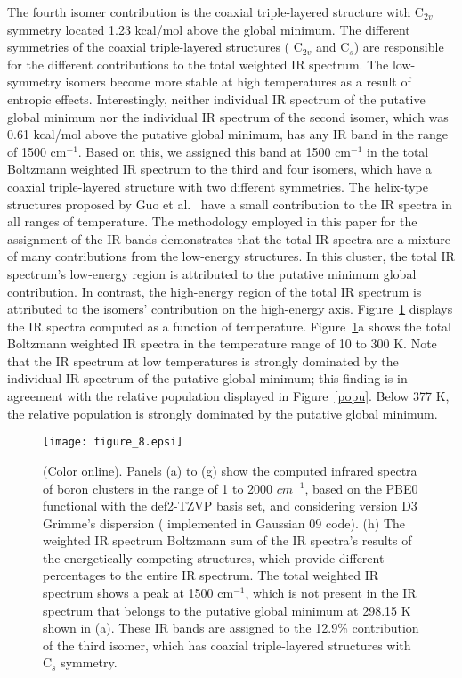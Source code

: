 \documentclass[prb,aps,preprint,showkeys,showpacs]{revtex4}
\begin{document}
The fourth isomer contribution is the coaxial triple-layered structure with C$_{2v}$ symmetry located 1.23 kcal/mol above the global minimum. The different symmetries of the coaxial triple-layered structures ( C$_{2v}$ and C$_s$) are responsible for the different contributions to the total weighted IR spectrum. The low-symmetry isomers become more stable at high temperatures as a result of entropic effects. Interestingly, neither individual IR spectrum of the putative global minimum nor the individual IR spectrum of the second isomer, which was 0.61 kcal/mol above the putative global minimum, has any IR band in the range of 1500 cm$^{-1}$. Based on this, we assigned this band at 1500 cm$^{-1}$ in the total Boltzmann weighted IR spectrum to the third and four isomers, which have a coaxial triple-layered structure with two different symmetries. The helix-type structures proposed by Guo et al.~\cite{Guo} have a small contribution to the IR spectra in all ranges of temperature. The methodology employed in this paper for the assignment of the IR bands demonstrates that the total IR spectra are a mixture of many contributions from the low-energy structures. In this cluster, the total IR spectrum’s low-energy region is attributed to the putative minimum global contribution. In contrast, the high-energy region of the total IR spectrum is attributed to the isomers’ contribution on the high-energy axis. 
Figure~\ref{irs8} displays the IR spectra computed as a function of temperature. Figure~\ref{irs8}a shows the total Boltzmann weighted IR spectra in the temperature range of 10 to 300 K. Note that the IR spectrum at low temperatures is strongly dominated by the individual IR spectrum of the putative global minimum; this finding is in agreement with the relative population displayed in Figure~\ref{popu}. Below 377 K, the relative population is strongly dominated by the putative global minimum.
\begin{figure}[ht!]
  \begin{center}
  \texttt{[image: figure\_8.epsi]} 
  \caption{(Color online). Panels (a) to (g) show the computed infrared spectra of boron clusters  in the range of 1 to 2000 $cm^{-1}$, based on the PBE0 functional with the def2-TZVP basis set, and considering version D3 Grimme’s dispersion ( implemented in Gaussian 09 code). (h) The weighted IR spectrum Boltzmann sum of the IR spectra’s results of the energetically competing structures, which provide different percentages to the entire IR spectrum. The total weighted IR spectrum shows a peak at 1500 cm$^{-1}$, which is not present in the IR spectrum that belongs to the putative global minimum at 298.15 K shown in (a). These IR bands are assigned to the 12.9{\%} contribution of the third isomer, which has coaxial triple-layered structures with C$_s$ symmetry.}
  \label{irs8}
  \end{center}
\end{figure}
\end{document}
